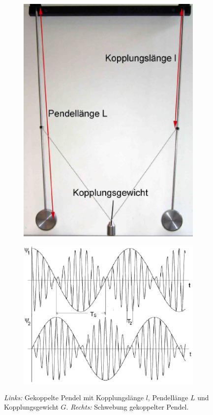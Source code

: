 \documentclass{article}
\begin{document}
\begin{figure}[H]
\begin{subfigure}{0.4\textwidth}
\includegraphics[width=0.9\linewidth]{gekoppelt.eps}
\end{subfigure}
\begin{subfigure}{0.6\textwidth}
\includegraphics[width=0.9\linewidth]{schwebung.eps}
\end{subfigure}
\caption{\textit{Links:} Gekoppelte Pendel mit Kopplungslänge $l$, Pendellänge $L$ und Kopplungsgewicht $G$. \textit{Rechts:} Schwebung gekoppelter Pendel.}
\end{figure}
\end{document}
